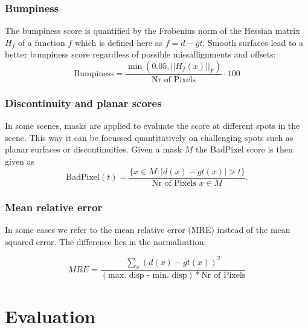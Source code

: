 \documentclass  [
  paper    = a4,
  BCOR     = 10mm,
  twoside,
  fontsize = 12pt,
  fleqn,
  toc      = bibnumbered,
  toc      = listofnumbered,
  numbers  = noendperiod,
  headings = normal,
  listof   = leveldown,
  version  = 3.03
]                                       {scrreprt}
\begin{document}
\subsection{Bumpiness}
The bumpiness score is quantified by the Frobenius norm of the Hessian matrix $H_f$ of a function $f$ which is defined here as $f = d-gt$. Smooth surfaces lead to a better bumpiness score regardless of possible missallignments and offsets:
\begin{equation}\label{key}
\text{Bumpiness} = \frac{\min(0.05, ||H_f(x)||_F)}{\text{Nr of Pixels}} \cdot 100
\end{equation}
\subsection{Discontinuity and planar scores}
In some scenes, masks are applied to evaluate the score at different spots in the scene. This way it can be focussed quantitatively on challenging spots such as planar surfaces or discontinuities. Given a mask $M$ the BadPixel score is then given as 
\begin{equation}\label{key}
\text{BadPixel}(t) = \frac{\{x \in M:|d(x) - gt(x)| > t \}}{\text{Nr of Pixels }x \in M}.
\end{equation}
\subsection{Mean relative error}
In some cases we refer to the mean relative error (MRE) instead of the mean squared error. The difference lies in the normalisation:

\begin{equation}\label{key}
MRE = \frac{\sum_{x} (d(x) - gt(x) )^2}{(\text{max. disp - min. disp})* \text{Nr of Pixels}}
\end{equation}



\chapter{Evaluation}
\label{Evaluation}
\end{document}
